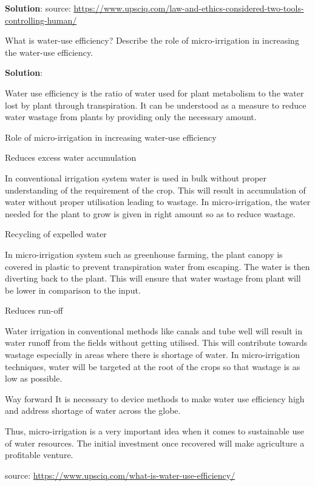 \documentclass[
  openany]{book}
\newcommand{\question}{\item}
\newenvironment{solution}{ {\bfseries Solution}:}{}
\begin{document}
\begin{questions}
\begin{solution}
source: \url{https://www.upsciq.com/law-and-ethics-considered-two-tools-controlling-human/}
\end{solution}

\question What is water-use efficiency? Describe the role of micro-irrigation in increasing the water-use efficiency.

\begin{solution}

Water use efficiency is the ratio of water used for plant metabolism to the water lost by plant through transpiration. It can be understood as a measure to reduce water wastage from plants by providing only the necessary amount.

Role of micro-irrigation in increasing water-use efficiency

Reduces excess water accumulation
    
In conventional irrigation system water is used in bulk without proper understanding of the requirement of the crop. This will result in accumulation of water without proper utilisation leading to wastage. In micro-irrigation, the water needed for the plant to grow is given in right amount so as to reduce wastage.

Recycling of expelled water

In micro-irrigation system such as greenhouse farming, the plant canopy is covered in plastic to prevent transpiration water from escaping. The water is then diverting back to the plant. This will ensure that water wastage from plant will be lower in comparison to the input.

Reduces run-off

Water irrigation in conventional methods like canals and tube well will result in water runoff from the fields without getting utilised. This will contribute towards wastage especially in areas where there is shortage of water. In micro-irrigation techniques, water will be targeted at the root of the crops so that wastage is as low as possible.

Way forward
It is necessary to device methods to make water use efficiency high and address shortage of water across the globe.

Thus, micro-irrigation is a very important idea when it comes to sustainable use of water resources. The initial investment once recovered will make agriculture a profitable venture.

source: \url{https://www.upsciq.com/what-is-water-use-efficiency/}
\end{solution}


\end{questions}
\end{document}
